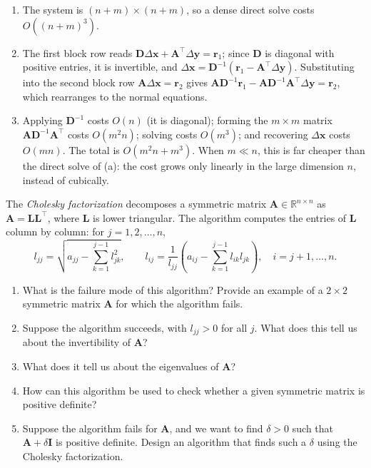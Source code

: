 \begin{solution}
    \begin{enumerate}[label=(\alph*)]
        \item The system is $(n+m) \times (n+m)$, so a dense direct solve costs $O((n+m)^3)$.
        \item The first block row reads $\mathbf{D}\Delta\mathbf{x} + \mathbf{A}^\top\Delta\mathbf{y} = \mathbf{r}_1$; since $\mathbf{D}$ is diagonal with positive entries, it is invertible, and $\Delta\mathbf{x} = \mathbf{D}^{-1}(\mathbf{r}_1 - \mathbf{A}^\top\Delta\mathbf{y})$. Substituting into the second block row $\mathbf{A}\Delta\mathbf{x} = \mathbf{r}_2$ gives $\mathbf{A}\mathbf{D}^{-1}\mathbf{r}_1 - \mathbf{A}\mathbf{D}^{-1}\mathbf{A}^\top\Delta\mathbf{y} = \mathbf{r}_2$, which rearranges to the normal equations.
        \item Applying $\mathbf{D}^{-1}$ costs $O(n)$ (it is diagonal); forming the $m \times m$ matrix $\mathbf{A}\mathbf{D}^{-1}\mathbf{A}^\top$ costs $O(m^2 n)$; solving costs $O(m^3)$; and recovering $\Delta\mathbf{x}$ costs $O(mn)$. The total is $O(m^2 n + m^3)$. When $m \ll n$, this is far cheaper than the direct solve of (a): the cost grows only linearly in the large dimension $n$, instead of cubically.
    \end{enumerate}
\end{solution}

\begin{exercise} %
    \label{ex:cholesky}
    The \emph{Cholesky factorization} decomposes a symmetric matrix $\mathbf{A} \in \mathbb{R}^{n \times n}$ as $\mathbf{A} = \mathbf{L}\mathbf{L}^\top$, where $\mathbf{L}$ is lower triangular.
    The algorithm computes the entries of $\mathbf{L}$ column by column: for $j = 1, 2, \dots, n$,
    \begin{equation*}
        l_{jj} = \sqrt{a_{jj} - \sum_{k=1}^{j-1} l_{jk}^2},
        \qquad
        l_{ij} = \frac{1}{l_{jj}} \left( a_{ij} - \sum_{k=1}^{j-1} l_{ik} l_{jk} \right), \quad i = j+1, \dots, n.
    \end{equation*}
    \begin{enumerate}[label=(\alph*)]
        \item What is the failure mode of this algorithm? Provide an example of a $2 \times 2$ symmetric matrix $\mathbf{A}$ for which the algorithm fails.
        \item Suppose the algorithm succeeds, with $l_{jj} > 0$ for all $j$. What does this tell us about the invertibility of $\mathbf{A}$?
        \item What does it tell us about the eigenvalues of $\mathbf{A}$?
        \item How can this algorithm be used to check whether a given symmetric matrix is positive definite?
        \item Suppose the algorithm fails for $\mathbf{A}$, and we want to find $\delta > 0$ such that $\mathbf{A} + \delta \mathbf{I}$ is positive definite. Design an algorithm that finds such a $\delta$ using the Cholesky factorization.
    \end{enumerate}
\end{exercise}

